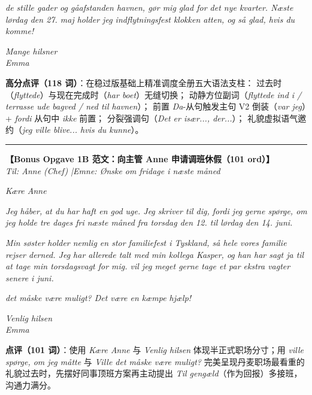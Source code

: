 \begin{answerbox}
\vspace{0.2em}
\textit{ de stille gader og gåafstanden  havnen,  gør mig glad for det nye kvarter. Næste lørdag den 27. maj holder jeg indflytningsfest klokken atten, og  så glad, hvis du  komme!}

\vspace{0.2em}
\textit{Mange hilsner\\
Emma}

\vspace{0.25em}
\small\textbf{高分点评（118 词）}：在稳过版基础上精准调度全册五大语法支柱： 过去时（\textit{flyttede}）与现在完成时（\textit{har boet}）无缝切换； 动静方位副词（\textit{flyttede ind i / terrasse ude bagved / ned til havnen}）； 前置 \textit{Da}-从句触发主句 V2 倒装（\textit{var jeg}）+ \textit{fordi} 从句中 \textit{ikke} 前置； 分裂强调句（\textit{Det er især..., der...}）； 礼貌虚拟语气邀约（\textit{jeg ville blive... hvis du kunne}）。

\vspace{0.45em}
\hrule
\vspace{0.45em}

\textbf{\color{NCDTeal}【Bonus Opgave 1B 范文：向主管 Anne 申请调班休假（101 ord）】}\\
\textit{Til: Anne (Chef) \quad|\quad Emne: Ønske om fridage i næste måned}

\vspace{0.25em}
\textit{Kære Anne}

\vspace{0.2em}
\textit{Jeg håber, at du har haft en god uge. Jeg skriver til dig, fordi jeg gerne  spørge, om jeg  holde tre dages fri næste måned fra torsdag den 12. til lørdag den 14. juni.}

\vspace{0.2em}
\textit{Min søster holder nemlig en stor familiefest i Tyskland, så hele vores familie rejser derned. Jeg har allerede talt med min kollega Kasper, og han har sagt ja til at tage min torsdagsvagt for mig.  vil jeg meget gerne tage et par ekstra vagter senere i juni.}

\vspace{0.2em}
\textit{ det måske være muligt? Det  være en kæmpe hjælp!}

\vspace{0.2em}
\textit{Venlig hilsen\\
Emma}

\vspace{0.25em}
\small\textbf{点评（101 词）}：使用 \textit{Kære Anne} 与 \textit{Venlig hilsen} 体现半正式职场分寸；用 \textit{ville spørge, om jeg måtte} 与 \textit{Ville det måske være muligt?} 完美呈现丹麦职场最看重的礼貌过去时，先摆好同事顶班方案再主动提出 \textit{Til gengæld}（作为回报）多接班，沟通力满分。
\end{answerbox}

